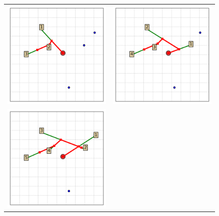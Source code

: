 \documentclass[11.5pt]{report}
\begin{document}
\begin{figure}[H]
\begin{tabular}{cc}
\includegraphics[width=8cm]{../webs/docs/algo-greedy-incremental-insertion---Day-2018-12-24_ClockTime-19:31:02/algo_state_00002.png}&
\includegraphics[width=8cm]{../webs/docs/algo-greedy-incremental-insertion---Day-2018-12-24_ClockTime-19:31:02/algo_state_00003.png}\\
\includegraphics[width=8cm]{../webs/docs/algo-greedy-incremental-insertion---Day-2018-12-24_ClockTime-19:31:02/algo_state_00004.png}&

\end{tabular}
\end{figure}
\end{document}
